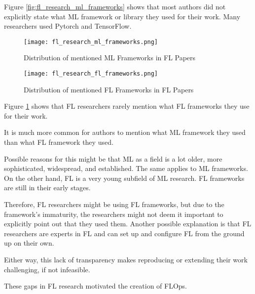 Figure \ref{fig:fl_research_ml_frameworks} shows that most authors
did not explicitly state what ML framework or library they used for their work.
Many researchers used Pytorch and TensorFlow.

\begin{figure}[p]
    \centering
    \texttt{[image: fl\_research\_ml\_frameworks.png]}
    \caption{Distribution of mentioned ML Frameworks in FL Papers}
    \label{fig:fl_research_ml_frameworks}

    \texttt{[image: fl\_research\_fl\_frameworks.png]}
    \caption{Distribution of mentioned FL Frameworks in FL Papers}
    \label{fig:fl_research_fl_frameworks}
\end{figure}

Figure \ref{fig:fl_research_fl_frameworks} shows that FL researchers
rarely mention what FL frameworks they use for their work.

It is much more common for authors to mention what ML 
framework they used than what FL framework they used.

Possible reasons for this might be that ML as a field is a lot older, more sophisticated,
widespread, and established.
The same applies to ML frameworks.
On the other hand, FL is a very young subfield of ML research.
FL frameworks are still in their early stages.

Therefore, FL researchers might be using FL frameworks, but due to the framework's immaturity,
the researchers might not deem it important to explicitly point out that they used them.
Another possible explanation is that FL researchers are experts in FL and
can set up and configure FL from the ground up on their own.

Either way, this lack of transparency makes reproducing or extending
their work challenging, if not infeasible.

These gaps in FL research motivated the creation of FLOps.
